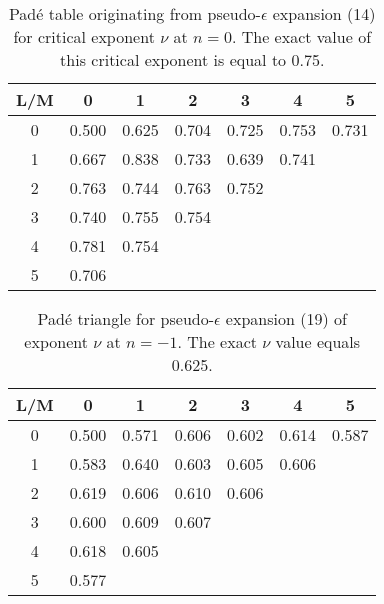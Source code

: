 \documentclass[aps,prb,preprint,showpacs,preprintnumbers,amsmath,amssymb]{revtex4}
\begin{document}
\begin{table}[t]
\caption{Pad\'e table originating from pseudo-$\epsilon$ expansion (14) for
critical exponent $\nu$ at $n=0$. The exact value of this critical exponent
is equal to 0.75.}
\label{tab2}
\renewcommand{\tabcolsep}{0.4cm}
\begin{tabular}{|*{7}{c|}}              \hline
              L/M & 0 & 1 & 2 & 3 & 4 & 5 \\ \hline
              0 & 0.500 & 0.625 & 0.704 & 0.725 & 0.753 & 0.731 \\ \hline
              1 & 0.667 & 0.838 & 0.733 & 0.639 & 0.741 &       \\ \hline
              2 & 0.763 & 0.744 & 0.763 & 0.752 &       &       \\ \hline
              3 & 0.740 & 0.755 & 0.754 &       &       &       \\ \hline
              4 & 0.781 & 0.754 &       &       &       &       \\ \hline
              5 & 0.706 &       &       &       &       &
               \\ \hline
\end{tabular}
\end{table}

\begin{table}[t]
\caption{Pad\'e triangle for pseudo-$\epsilon$ expansion (19) of exponent
$\nu$ at $n = -1$. The exact $\nu$ value equals 0.625.}
\label{tab3}
\renewcommand{\tabcolsep}{0.4cm}
\begin{tabular}{|*{7}{c|}}
              \hline
              L/M & 0 & 1 & 2 & 3 & 4 & 5 \\ \hline
              0 & 0.500 & 0.571 & 0.606 & 0.602 & 0.614 & 0.587 \\ \hline
              1 & 0.583 & 0.640 & 0.603 & 0.605 & 0.606 &       \\ \hline
              2 & 0.619 & 0.606 & 0.610 & 0.606 &       &       \\ \hline
              3 & 0.600 & 0.609 & 0.607 &       &       &       \\ \hline
              4 & 0.618 & 0.605 &       &       &       &       \\ \hline
              5 & 0.577 &       &       &       &       &
               \\ \hline
\end{tabular}
\end{table}
\end{document}
